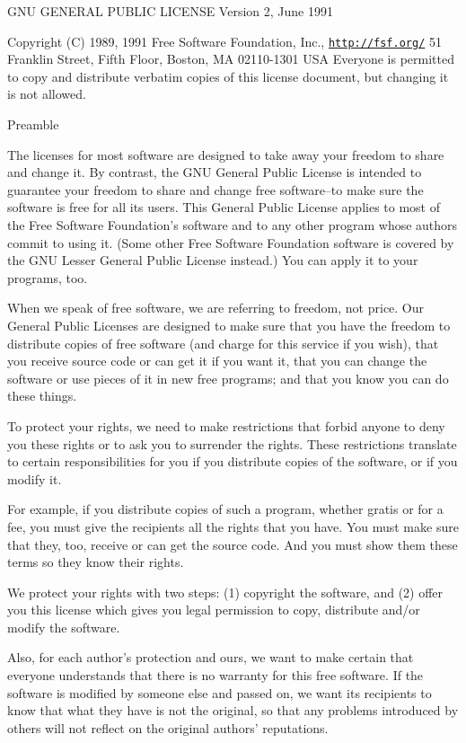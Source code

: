 G\-N\-U G\-E\-N\-E\-R\-A\-L P\-U\-B\-L\-I\-C L\-I\-C\-E\-N\-S\-E Version 2, June 1991

Copyright (C) 1989, 1991 Free Software Foundation, Inc., \href{http://fsf.org/}{\tt http\-://fsf.\-org/} 51 Franklin Street, Fifth Floor, Boston, M\-A 02110-\/1301 U\-S\-A Everyone is permitted to copy and distribute verbatim copies of this license document, but changing it is not allowed. \begin{DoxyVerb}                       Preamble
\end{DoxyVerb}


The licenses for most software are designed to take away your freedom to share and change it. By contrast, the G\-N\-U General Public License is intended to guarantee your freedom to share and change free software--to make sure the software is free for all its users. This General Public License applies to most of the Free Software Foundation's software and to any other program whose authors commit to using it. (Some other Free Software Foundation software is covered by the G\-N\-U Lesser General Public License instead.) You can apply it to your programs, too.

When we speak of free software, we are referring to freedom, not price. Our General Public Licenses are designed to make sure that you have the freedom to distribute copies of free software (and charge for this service if you wish), that you receive source code or can get it if you want it, that you can change the software or use pieces of it in new free programs; and that you know you can do these things.

To protect your rights, we need to make restrictions that forbid anyone to deny you these rights or to ask you to surrender the rights. These restrictions translate to certain responsibilities for you if you distribute copies of the software, or if you modify it.

For example, if you distribute copies of such a program, whether gratis or for a fee, you must give the recipients all the rights that you have. You must make sure that they, too, receive or can get the source code. And you must show them these terms so they know their rights.

We protect your rights with two steps\-: (1) copyright the software, and (2) offer you this license which gives you legal permission to copy, distribute and/or modify the software.

Also, for each author's protection and ours, we want to make certain that everyone understands that there is no warranty for this free software. If the software is modified by someone else and passed on, we want its recipients to know that what they have is not the original, so that any problems introduced by others will not reflect on the original authors' reputations.


